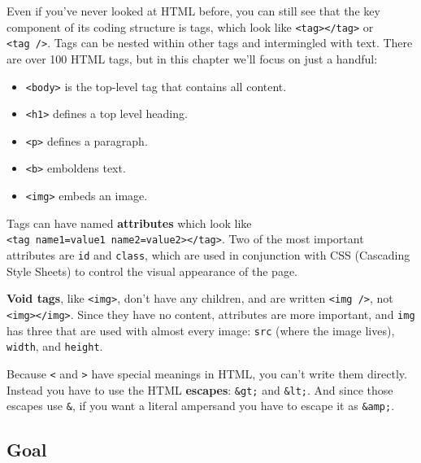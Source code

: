 \documentclass[]{book}
\providecommand{\tightlist}{%
  \setlength{\itemsep}{0pt}\setlength{\parskip}{0pt}}
\begin{document}
Even if you've never looked at HTML before, you can still see that the key component of its coding structure is tags, which look like \texttt{\textless{}tag\textgreater{}\textless{}/tag\textgreater{}} or \texttt{\textless{}tag\ /\textgreater{}}. Tags can be nested within other tags and intermingled with text. There are over 100 HTML tags, but in this chapter we'll focus on just a handful:

\begin{itemize}
\tightlist
\item
  \texttt{\textless{}body\textgreater{}} is the top-level tag that contains all content.
\item
  \texttt{\textless{}h1\textgreater{}} defines a top level heading.
\item
  \texttt{\textless{}p\textgreater{}} defines a paragraph.
\item
  \texttt{\textless{}b\textgreater{}} emboldens text.
\item
  \texttt{\textless{}img\textgreater{}} embeds an image.
\end{itemize}

Tags can have named \textbf{attributes} which look like \texttt{\textless{}tag\ name1=\textquotesingle{}value1\textquotesingle{}\ name2=\textquotesingle{}value2\textquotesingle{}\textgreater{}\textless{}/tag\textgreater{}}. Two of the most important attributes are \texttt{id} and \texttt{class}, which are used in conjunction with CSS (Cascading Style Sheets) to control the visual appearance of the page.

\textbf{Void tags}, like \texttt{\textless{}img\textgreater{}}, don't have any children, and are written \texttt{\textless{}img\ /\textgreater{}}, not \texttt{\textless{}img\textgreater{}\textless{}/img\textgreater{}}. Since they have no content, attributes are more important, and \texttt{img} has three that are used with almost every image: \texttt{src} (where the image lives), \texttt{width}, and \texttt{height}.

Because \texttt{\textless{}} and \texttt{\textgreater{}} have special meanings in HTML, you can't write them directly. Instead you have to use the HTML \textbf{escapes}: \texttt{\&gt;} and \texttt{\&lt;}. And since those escapes use \texttt{\&}, if you want a literal ampersand you have to escape it as \texttt{\&amp;}.

\hypertarget{goal}{%
\subsection{Goal}\label{goal}}
\end{document}
